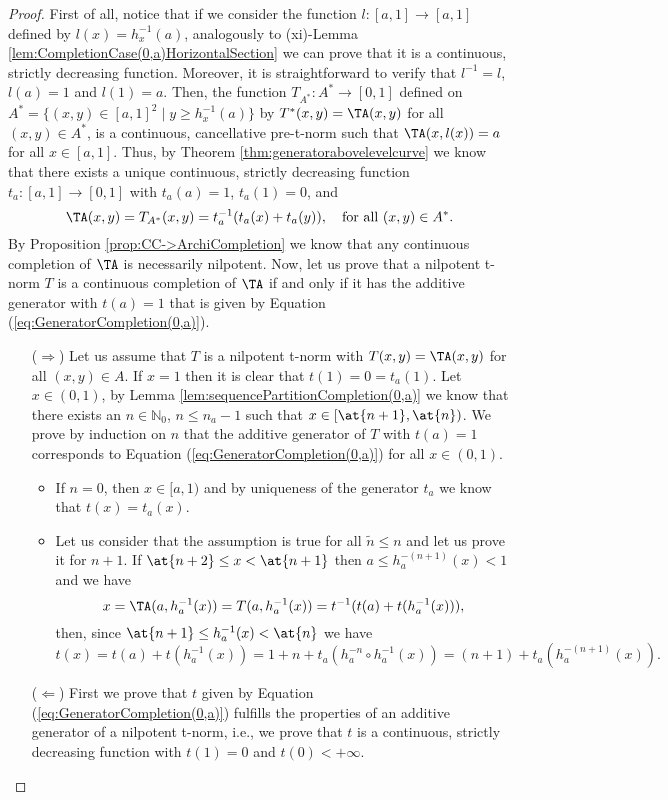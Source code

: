 \begin{proof}
	First of all, notice that if we consider the function $l:[a,1] \to [a,1]$ defined by $l(x)=h_x^{-1}(a)$, analogously to (xi)-Lemma \ref{lem:CompletionCase(0,a)HorizontalSection} we can prove that it is a continuous, strictly decreasing function. Moreover, it is straightforward to verify that $l^{-1}=l$, $l(a)=1$ and $l(1)=a$. Then, the function $T_{A^*}: A^* \to [0,1]$ defined on $A^*=\{(x,y) \in [a,1]^2 \mid y \geq h_x^{-1}(a)\}$ by $T^*(x,y)=\TA(x,y)$ for all $(x,y) \in A^*$, is a continuous, cancellative pre-t-norm such that $\TA(x,l(x))=a$ for all $x \in [a,1]$. Thus,  by Theorem \ref{thm:generatorabovelevelcurve} we know that there exists a unique continuous, strictly decreasing function $t_a:[a,1] \to [0,1]$ with $t_a(a)=1$, $t_a(1)=0$, and
	$$\TA(x,y)=T_{A^*}(x,y)=t_a^{-1}(t_a(x)+t_a(y)), \quad \text{for all } (x,y) \in A^*.$$
	By Proposition \ref{prop:CC->ArchiCompletion} we know that any continuous completion of $\TA$ is necessarily nilpotent. Now, let us prove that a nilpotent t-norm $T$ is a continuous completion of $\TA$ if and only if it has the additive generator with $t(a)=1$ that is given by Equation (\ref{eq:GeneratorCompletion(0,a)}).
	\begin{itemize}
		\item[($\Rightarrow$)] Let us assume that $T$ is a nilpotent t-norm with $T(x,y)=\TA(x,y)$ for all $(x,y) \in A$. If $x=1$ then it is clear that $t(1)=0=t_a(1)$. Let $x \in (0,1)$, by Lemma \ref{lem:sequencePartitionCompletion(0,a)} we know that there exists an $n \in \mathbb{N}_0$, $n \leq n_a-1$ such that $x \in [\at{n+1},\at{n})$. We prove by induction on $n$ that the additive generator of $T$ with $t(a)=1$ corresponds to Equation (\ref{eq:GeneratorCompletion(0,a)}) for all $x \in (0,1)$.
		\begin{itemize}
			\item If $n=0$, then $x \in [a,1)$ and by uniqueness of the generator $t_a$ we know that $t(x)=t_a(x)$.
			\item Let us consider that the assumption is true for all $\tilde{n} \leq n$ and let us prove it for $n+1$. If $ \at{n+2} \leq x < \at{n+1}$ then $a \leq h_a^{-(n+1)}(x) < 1$ and we have
			$$x=\TA(a,h_a^{-1}(x))=T(a,h_a^{-1}(x))=t^{-1}(t(a)+t(h_a^{-1}(x))),$$
			then, since $\at{n+1} \leq h_a^{-1}(x) < \at{n}$ we have
			$$t(x)=t(a)+t(h_a^{-1}(x)) = 1 + n + t_a(h_a^{-n} \circ h_a^{-1}(x)) = (n+1) + t_a(h_a^{-(n+1)}(x)).$$
		\end{itemize}
		\item[($\Leftarrow$)] First we prove that $t$ given by Equation (\ref{eq:GeneratorCompletion(0,a)}) fulfills the properties of an additive generator of a nilpotent t-norm, i.e., we prove that $t$ is a continuous, strictly decreasing function with $t(1)=0$ and $t(0)<+\infty$.

\end{itemize}
\end{proof}
